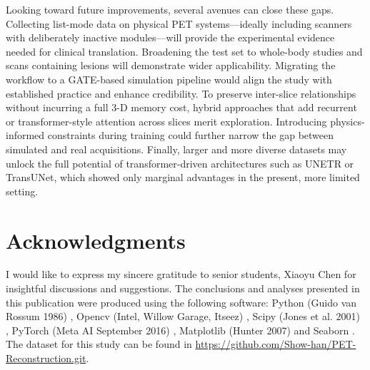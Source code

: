 \documentclass[aps,prb,preprint,groupedaddress,showkeys]{revtex4}
\begin{document}
Looking toward future improvements, several avenues can close these gaps. Collecting list-mode data on physical PET systems—ideally including scanners with deliberately inactive modules—will provide the experimental evidence needed for clinical translation. Broadening the test set to whole-body studies and scans containing lesions will demonstrate wider applicability. Migrating the workflow to a GATE-based simulation pipeline would align the study with established practice and enhance credibility. To preserve inter-slice relationships without incurring a full 3-D memory cost, hybrid approaches that add recurrent or transformer-style attention across slices merit exploration. Introducing physics-informed constraints during training could further narrow the gap between simulated and real acquisitions. Finally, larger and more diverse datasets may unlock the full potential of transformer-driven architectures such as UNETR or TransUNet, which showed only marginal advantages in the present, more limited setting.









\section{Acknowledgments}
I would like to express my sincere gratitude to senior students, Xiaoyu Chen for insightful discussions and suggestions.
The conclusions and analyses presented in this publication were produced using the following software: Python (Guido van Rossum 1986) \cite{10.5555/1593511}, Opencv (Intel, Willow Garage, Itseez) \cite{itseez2015opencv}, Scipy (Jones et al. 2001) \cite{2020SciPy-NMeth}, PyTorch  (Meta AI September 2016) \cite{NEURIPS2019_9015}, Matplotlib (Hunter 2007) \cite{Hunter:2007} and Seaborn \cite{Waskom2021}.
The dataset for this study can be found in \url{https://github.com/Show-han/PET-Reconstruction.git}.


\end{document}
